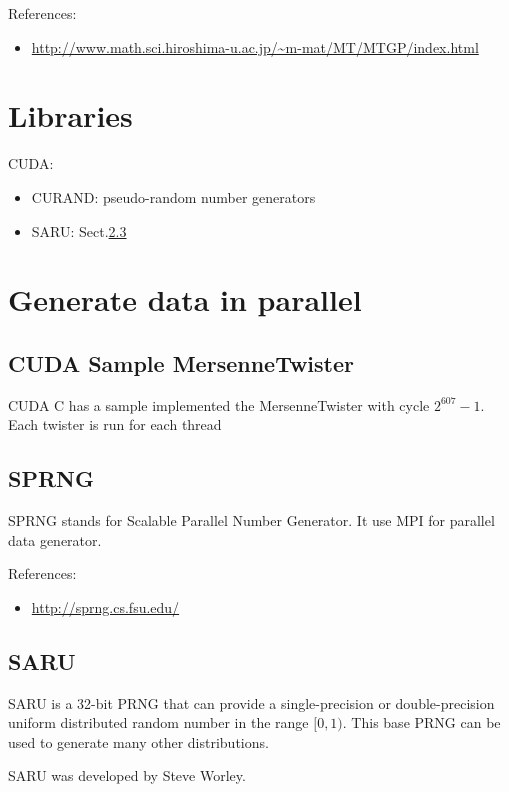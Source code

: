 References:
\begin{itemize}
\item \url{http://www.math.sci.hiroshima-u.ac.jp/~m-mat/MT/MTGP/index.html}
\end{itemize}

\section{Libraries}

CUDA:
\begin{itemize}
  \item CURAND: pseudo-random number generators
  \item SARU: Sect.\ref{sec:saru}
\end{itemize}


\section{Generate data in parallel}
\label{sec:gener-data-parall}

\subsection{CUDA Sample MersenneTwister}
\label{sec:cuda-mersennetwister}

CUDA C has a sample implemented the MersenneTwister with cycle
$2^{607}-1$. Each twister is run for each thread

\subsection{SPRNG}
\label{sec:sprng}

SPRNG stands for Scalable Parallel Number Generator. It use MPI for
parallel data generator.

References:
\begin{itemize}
\item \url{http://sprng.cs.fsu.edu/}
\end{itemize}


\subsection{SARU}
\label{sec:saru}

SARU is a 32-bit PRNG that can provide a single-precision or
double-precision uniform distributed random number in the range
$[0,1)$. This base PRNG can be used to generate many other
distributions. 

SARU was developed by Steve Worley.